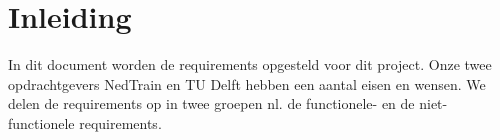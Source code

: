 \section{Inleiding}
In dit document worden de requirements opgesteld voor dit project. Onze twee opdrachtgevers NedTrain en TU Delft hebben een aantal eisen en wensen. We delen de requirements op in twee groepen nl. de functionele- en de niet-functionele requirements. 
